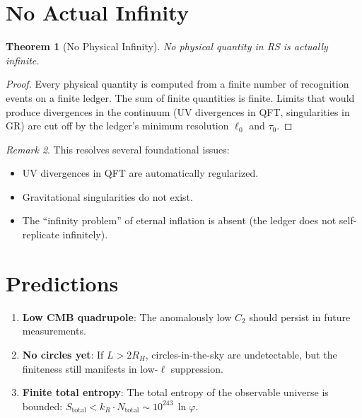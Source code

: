 \documentclass[12pt,a4paper]{article}
\newtheorem{theorem}{Theorem}[section]
\theoremstyle{definition}
\theoremstyle{remark}
\newtheorem{remark}[theorem]{Remark}
\begin{document}
\section{No Actual Infinity}
\label{sec:no-infinity}

\begin{theorem}[No Physical Infinity]
No physical quantity in RS is actually infinite.
\end{theorem}

\begin{proof}
Every physical quantity is computed from a finite number of
recognition events on a finite ledger.  The sum of finite quantities
is finite.  Limits that would produce divergences in the continuum
(UV divergences in QFT, singularities in GR) are cut off by the
ledger's minimum resolution $\ell_0$ and $\tau_0$.
\end{proof}

\begin{remark}
This resolves several foundational issues:
\begin{itemize}
  \item UV divergences in QFT are automatically regularized.
  \item Gravitational singularities do not exist.
  \item The ``infinity problem'' of eternal inflation is absent
  (the ledger does not self-replicate infinitely).
\end{itemize}
\end{remark}

\section{Predictions}
\label{sec:predictions}

\begin{enumerate}
  \item \textbf{Low CMB quadrupole}: The anomalously low $C_2$
  should persist in future measurements.

  \item \textbf{No circles yet}: If $L > 2R_H$, circles-in-the-sky
  are undetectable, but the finiteness still manifests in low-$\ell$
  suppression.

  \item \textbf{Finite total entropy}: The total entropy of the
  observable universe is bounded:
  $S_{\mathrm{total}} < k_R \cdot N_{\mathrm{total}} \sim
  10^{243}\,\ln\varphi$.
\end{enumerate}
\end{document}
